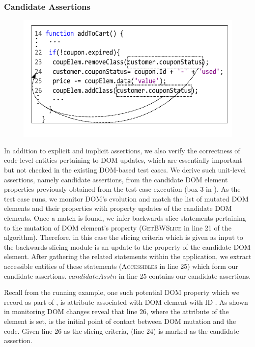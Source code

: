 \subsubsection{Candidate Assertions} \label{Sec:candidateAssertions}
\begin{figure}[!t]
  \centering
  \includegraphics[width=.9\hsize]{fig/candidateDOMToCode}
  \vspace{-0.1in} 
  \label{Fig:candidateDOMToCode}
  \vspace{-0.1in} 
\end{figure}
In addition to explicit and implicit assertions, we also verify the correctness of code-level entities pertaining to DOM updates, which are essentially important but not checked in the existing DOM-based test cases. We derive such unit-level assertions, namely candidate assertions, from the candidate DOM element properties previously obtained from the test case execution (box 3 in ). As the test case runs, we monitor DOM's evolution and match the list of mutated DOM elements and their properties with property updates of the candidate DOM elements. Once a match is found, we infer backwards slice statements pertaining to the mutation of DOM element's property (\textsc{GetBWSlice} in line 21 of the algorithm). Therefore, in this case the slicing criteria which is given as input to the backwards slicing module is an update to the property of the candidate DOM element.
After gathering the related \javascript statements within the application, we extract accessible entities of these statements (\textsc{Accessibles} in line 25) which form our candidate assertions. $candidateAsstn$ in line 25 contains our candidate assertions. 

Recall from the running example, one such potential DOM property which we record as part of , is  attribute associated with DOM element with ID . As shown in  monitoring DOM changes reveal that line 26, where the  attribute of the element is set, is the initial point of contact between DOM mutation and the \javascript code. Given line 26 as the slicing criteria,  (line 24) is marked as the candidate assertion.